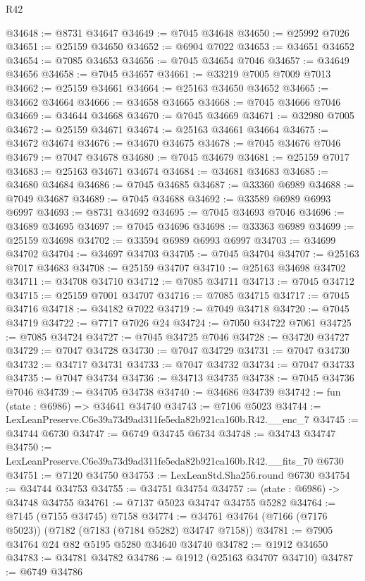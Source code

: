 \begin{lexlean}{R42}
\begin{coremodule}
{@34648 := @8731 @34647
@34649 := @7045 @34648
@34650 := @25992 @7026
@34651 := @25159 @34650
@34652 := @6904 @7022
@34653 := @34651 @34652
@34654 := @7085 @34653
@34656 := @7045 @34654 @7046
@34657 := @34649 @34656
@34658 := @7045 @34657
@34661 := @33219 @7005 @7009 @7013
@34662 := @25159 @34661
@34664 := @25163 @34650 @34652
@34665 := @34662 @34664
@34666 := @34658 @34665
@34668 := @7045 @34666 @7046
@34669 := @34644 @34668
@34670 := @7045 @34669
@34671 := @32980 @7005
@34672 := @25159 @34671
@34674 := @25163 @34661 @34664
@34675 := @34672 @34674
@34676 := @34670 @34675
@34678 := @7045 @34676 @7046
@34679 := @7047 @34678
@34680 := @7045 @34679
@34681 := @25159 @7017
@34683 := @25163 @34671 @34674
@34684 := @34681 @34683
@34685 := @34680 @34684
@34686 := @7045 @34685
@34687 := @33360 @6989
@34688 := @7049 @34687
@34689 := @7045 @34688
@34692 := @33589 @6989 @6993 @6997
@34693 := @8731 @34692
@34695 := @7045 @34693 @7046
@34696 := @34689 @34695
@34697 := @7045 @34696
@34698 := @33363 @6989
@34699 := @25159 @34698
@34702 := @33594 @6989 @6993 @6997
@34703 := @34699 @34702
@34704 := @34697 @34703
@34705 := @7045 @34704
@34707 := @25163 @7017 @34683
@34708 := @25159 @34707
@34710 := @25163 @34698 @34702
@34711 := @34708 @34710
@34712 := @7085 @34711
@34713 := @7045 @34712
@34715 := @25159 @7001 @34707
@34716 := @7085 @34715
@34717 := @7045 @34716
@34718 := @34182 @7022
@34719 := @7049 @34718
@34720 := @7045 @34719
@34722 := @7717 @7026 @24
@34724 := @7050 @34722 @7061
@34725 := @7085 @34724
@34727 := @7045 @34725 @7046
@34728 := @34720 @34727
@34729 := @7047 @34728
@34730 := @7047 @34729
@34731 := @7047 @34730
@34732 := @34717 @34731
@34733 := @7047 @34732
@34734 := @7047 @34733
@34735 := @7047 @34734
@34736 := @34713 @34735
@34738 := @7045 @34736 @7046
@34739 := @34705 @34738
@34740 := @34686 @34739
@34742 := fun (state : @6986) => @34641 @34740
@34743 := @7106 @5023
@34744 := LexLeanPreserve.C6e39a73d9ad311fe5eda82b921ca160b.R42.__enc_7
@34745 := @34744 @6730
@34747 := @6749 @34745 @6734
@34748 := @34743 @34747
@34750 := LexLeanPreserve.C6e39a73d9ad311fe5eda82b921ca160b.R42.__fits_70 @6730
@34751 := @7120 @34750
@34753 := LexLeanStd.Sha256.round @6730
@34754 := @34744 @34753
@34755 := @34751 @34754
@34757 := (state : @6986) -> @34748 @34755
@34761 := @7137 @5023 @34747 @34755 @5282
@34764 := @7145 (@7155 @34745) @7158
@34774 := @34761 @34764 (@7166 (@7176 @5023)) (@7182 (@7183 (@7184 @5282) @34747 @7158))
@34781 := @7905 @34764 @24 @82 @5195 @5280 @34640 @34740
@34782 := @1912 @34650
@34783 := @34781 @34782
@34786 := @1912 (@25163 @34707 @34710)
@34787 := @6749 @34786
}
\end{coremodule}
\end{lexlean}
